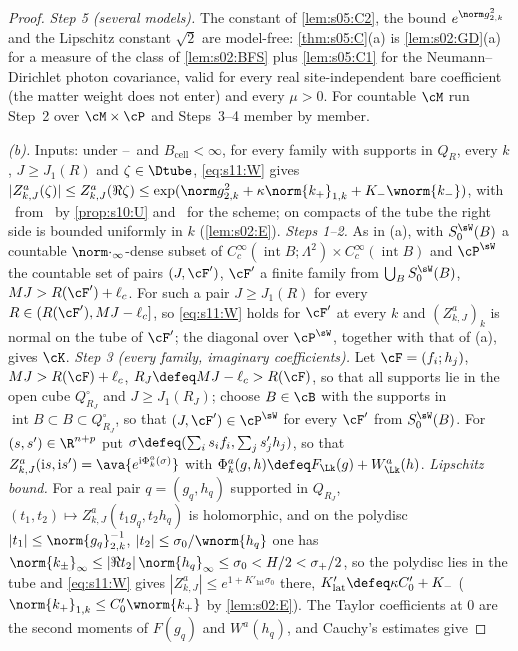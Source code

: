 \begin{proof}
\emph{Step 5 (several models).} The constant of \cref{lem:s05:C2}, the bound $e^{\norm g^2_{2,k}}$ and the Lipschitz constant $\sqrt2$ are model-free: \cref{thm:s05:C}(a) is \cref{lem:s02:GD}(a) for a measure of the class of \cref{lem:s02:BFS} plus \cref{lem:s05:C1} for the Neumann--Dirichlet photon covariance, valid for every real site-independent bare coefficient (the matter weight does not enter) and every $\mu>0$. For countable $\cM$ run Step~2 over $\cM\times\cP$ and Steps~3--4 member by member.

\emph{(b).} Inputs: under \Itwo--\Ifour\ and $B_{\mathrm{cell}}<\infty$, for every family with supports in $Q_R$, every $k$, $J\ge J_1(R)$ and $\zeta\in\Dtube$, \eqref{eq:s11:W} gives $|Z^a_{k,J}(\zeta)|\le Z^a_{k,J}(\Re\zeta)\le\exp(\norm g^2_{2,k}+\kappa\norm{k_+}_{1,k}+K_-\wnorm{k_-})$, with \Itwo\ from \Tthree\ by \cref{prop:s10:U} and \SCH\ for the scheme; on compacts of the tube the right side is bounded uniformly in $k$ (\cref{lem:s02:E}).
\emph{Steps 1--2.} As in (a), with $S^{\sW}_0(B)$ a countable $\norm\cdot_\infty$-dense subset of $C^\infty_c(\operatorname{int}B;\Lambda^2)\times C^\infty_c(\operatorname{int}B)$ and $\cP^{\sW}$ the countable set of pairs $(J,\cF')$, $\cF'$ a finite family from $\bigcup_BS^{\sW}_0(B)$, $MJ>R(\cF')+\ell_c$. For such a pair $J\ge J_1(R)$ for every $R\in(R(\cF'),MJ-\ell_c]$, so \eqref{eq:s11:W} holds for $\cF'$ at every $k$ and $(Z^a_{k,J})_k$ is normal on the tube of $\cF'$; the diagonal over $\cP^{\sW}$, together with that of (a), gives $\cK$.
\emph{Step 3 (every family, imaginary coefficients).} Let $\cF=(f_i;h_j)$, $MJ>R(\cF)+\ell_c$, $R_J\defeq MJ-\ell_c>R(\cF)$, so that all supports lie in the open cube $Q^\circ_{R_J}$ and $J\ge J_1(R_J)$; choose $B\in\cB$ with the supports in $\operatorname{int}B\subset B\subset Q^\circ_{R_J}$, so that $(J,\cF')\in\cP^{\sW}$ for every $\cF'$ from $S^{\sW}_0(B)$. For $(s,s')\in\R^{n+p}$ put $\sigma\defeq(\sum_is_if_i,\sum_js'_jh_j)$, so that $Z^a_{k,J}(\mathrm is,\mathrm is')=\ava{e^{\mathrm i\Phi^a_k(\sigma)}}$ with $\Phi^a_k(g,h)\defeq F_{\Lk}(g)+W^a_{\Lk}(h)$. \emph{Lipschitz bound.} For a real pair $q=(g_q,h_q)$ supported in $Q_{R_J}$, $(t_1,t_2)\mapsto Z^a_{k,J}(t_1g_q,t_2h_q)$ is holomorphic, and on the polydisc $|t_1|\le\norm{g_q}_{2,k}^{-1}$, $|t_2|\le\sigma_0/\wnorm{h_q}$ one has $\norm{k_\pm}_\infty\le|\Re t_2|\,\norm{h_q}_\infty\le\sigma_0<H/2<\sigma_+/2$, so the polydisc lies in the tube and \eqref{eq:s11:W} gives $|Z^a_{k,J}|\le e^{1+K'_{\mathrm{lat}}\sigma_0}$ there, $K'_{\mathrm{lat}}\defeq\kappa C_0'+K_-$ ($\norm{k_+}_{1,k}\le C_0'\wnorm{k_+}$ by \cref{lem:s02:E}). The Taylor coefficients at $0$ are the second moments of $F(g_q)$ and $W^a(h_q)$, and Cauchy's estimates give

\end{proof}
